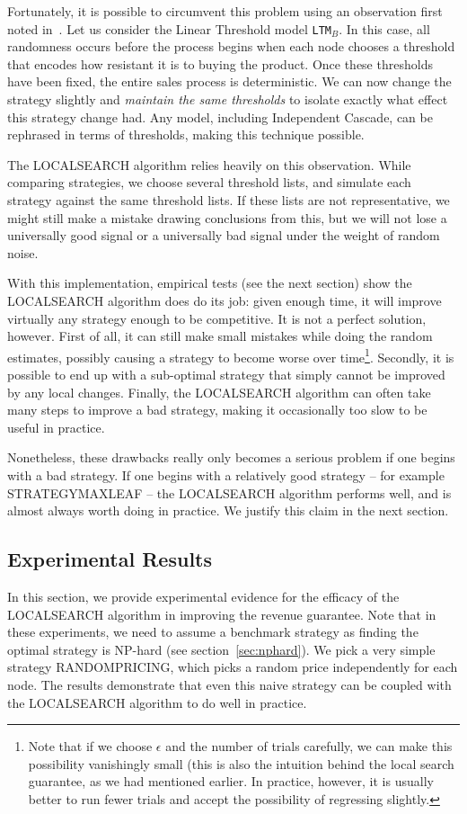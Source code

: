 \documentclass[letterpaper,twoside]{article}
\newcommand{\LTM}[1]{\texttt{LTM}$_{#1}$}
\newcommand{\strategyml}{\textrm{S{\scriptsize TRATEGY}\-M{\scriptsize AX}\-L{\scriptsize EAF}}}
\newcommand{\LS}{\textrm{L{\scriptsize OCAL}\-S{\scriptsize EARCH}}}
\newcommand{\rand}{\textrm{R{\scriptsize ANDOM}\-P{\scriptsize RICING}}}
\begin{document}
Fortunately, it is possible to circumvent this problem using an observation
first noted in~\cite{KKT03}. Let us consider the
Linear Threshold model \LTM{B}. In this case, all randomness occurs before
the process begins when each node chooses a threshold that encodes how
resistant it is to buying the product. Once these thresholds have been fixed,
the entire sales process is deterministic. We can now change the strategy
slightly and {\em maintain the same thresholds} to isolate exactly what
effect this strategy change had. Any model, including Independent Cascade,
can be rephrased in terms of thresholds, making this technique possible.

The \LS{} algorithm relies heavily on this observation. While comparing
strategies, we choose several threshold lists, and simulate each strategy
against the same threshold lists.  If these lists are not representative, we
might still make a mistake drawing conclusions from this, but we will not
lose a universally good signal or a universally bad signal under the weight
of random noise.

With this implementation, empirical tests (see the next section) show the
\LS{} algorithm does do its job: given enough time, it will improve virtually
any strategy enough to be competitive.  It is not a perfect solution,
however. First of all, it can still make small mistakes while doing the
random estimates, possibly causing a strategy to become worse over
time\footnote{Note that if we choose $\epsilon$ and the number of trials
  carefully, we can make this possibility vanishingly small (this is also the
  intuition behind the local search guarantee, as we had mentioned
  earlier. In practice, however, it is usually better to run fewer trials and
  accept the possibility of regressing slightly.}.  Secondly, it is possible
to end up with a sub-optimal strategy that simply cannot be improved by any
local changes. Finally, the \LS{} algorithm can often take many steps to
improve a bad strategy, making it occasionally too slow to be useful in
practice.

Nonetheless, these drawbacks really only becomes a serious problem if one
begins with a bad strategy.  If one begins with a relatively good strategy --
for example \strategyml{} -- the \LS{} algorithm performs well, and is almost
always worth doing in practice. We justify this claim in the next section.

\subsection{Experimental Results}
In this section, we provide experimental evidence for the efficacy of the
\LS{} algorithm in improving the revenue guarantee. Note that in these
experiments, we need to assume a benchmark strategy as finding the optimal
strategy is NP-hard (see section~\ref{sec:nphard}). We pick a very simple
strategy \rand, which picks a random price independently for each node. The
results demonstrate that even this naive strategy can be coupled with the
\LS{} algorithm to do well in practice.
\end{document}
